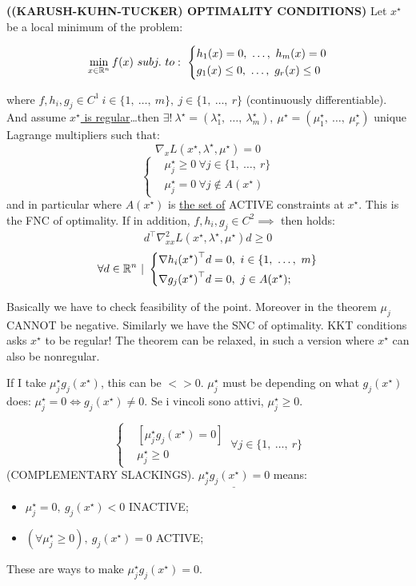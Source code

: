 \begin{thrm}{\textbf{((KARUSH-KUHN-TUCKER) OPTIMALITY CONDITIONS)}} \newline
Let $x^\star$ be a local minimum of the problem:

\[
	\min_{x\in\R^n}{f(x)}\ subj.\ to:\ 
	\left\{
	\begin{aligned}
	&h_1(x) = 0,\ \dots,\ h_m(x) = 0\\
	&g_1(x) \leq 0,\ \dots,\ g_r(x) \leq 0
	\end{aligned}
	\right.
\]

where $f,h_i,g_j \in C^1\ i\in\{1,\ \dots,\ m\},\ j\in\{1,\ \dots,\ r\}$ (continuously differentiable). And assume \underline{$x^\star$ is regular}\dots then $\exists!\ \lambda^\star=(\lambda_1^\star,\ \dots,\ \lambda_m^\star),\ \mu^\star=(\mu_1^\star,\ \dots,\ \mu_r^\star)$ unique Lagrange multipliers such that:
\[
	\nabla_x{L(x^\star, \lambda^\star, \mu^\star)} = 0
\]
\[
	\left\{
	\begin{aligned}
	&\mu_j^\star \geq 0\ \forall j\in\{1,\ \dots,\ r\}\\
	&\mu_j^\star=0\ \forall j\notin A(x^\star)
	\end{aligned}
	\right.
\]
and in particular where $A(x^\star)$ is \underline{the set of} ACTIVE constraints at $x^\star$. This is the FNC of optimality. If in addition, $f,h_i,g_j\in C^2 \implies$ then holds:
\[ 
	d^\top \nabla_{xx}^2{L(x^\star,\lambda^\star,\mu^\star)} d \geq 0
\]
\[
	\forall d\in\mathbb{R}^n\ |\ \left\{
	\begin{aligned}
	&\nabla{h_i(x^\star)}^\top d = 0,\ i\in\{1,\ \dots,\ m\}\\
	&\nabla{g_j(x^\star)}^\top d = 0,\ j\in A(x^\star);
	\end{aligned}
	\right.
\]

Basically we have to check feasibility of the point. Moreover in the theorem $\mu_j$ CANNOT be negative. Similarly we have the SNC of optimality. KKT conditions asks $x^\star$ to be regular! The theorem can be relaxed, in such a version where $x^\star$ can also be nonregular.

If I take $\mu_j^\star g_j(x^\star)$, this can be $<> 0$. $\mu_j^\star$ must be depending on what $g_j(x^\star)$ does: $\mu_j^\star = 0 \iff g_j(x^\star) \neq 0$. Se i vincoli sono attivi, $\mu_j^\star \geq 0$.

\[
	\left\{
	\begin{aligned}
	&[\mu_j^\star g_j(x^\star) = 0]\\
	&\mu_j^\star \geq 0
	\end{aligned}
	\right.\ \forall j\in\{1,\ \dots,\ r\}
\]
(COMPLEMENTARY SLACKINGS). $\underline{\mu_j^\star g_j(x^\star) = 0}$ means:
\begin{itemize}
\item $\mu_j^\star = 0,\ g_j(x^\star) < 0$ INACTIVE;
\item $(\forall \mu_j^\star \geq 0),\ g_j(x^\star) = 0$ ACTIVE;
\end{itemize}
These are ways to make $\mu_j^\star g_j(x^\star) = 0$.
\end{thrm}

